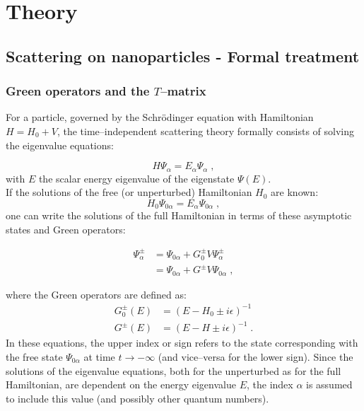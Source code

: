 \chapter{Theory} \label{appendixtheory}

\section{Scattering on nanoparticles - Formal treatment} \label{sec:formal}

\subsection{Green operators and the $T$--matrix}

For a particle, governed by the Schr\"odinger equation with Hamiltonian $H = H_0 + V$, the time--independent scattering theory formally consists of solving the eigenvalue equations:

\begin{equation*}
  H\Psi_\alpha = E_\alpha\Psi_\alpha \; ,
\end{equation*}
with $E$ the scalar energy eigenvalue of the eigenstate $\Psi(E)$.\\
If the solutions of the free (or unperturbed) Hamiltonian $H_0$ are known:
\begin{equation*}
  H_0\Psi_{0\alpha} = E_\alpha\Psi_{0\alpha} \; ,
\end{equation*}
one can write the solutions of the full Hamiltonian in terms of these asymptotic states and Green operators:

\begin{align*}
  \Psi^\pm_\alpha &= \Psi_{0\alpha} + G^\pm_0 V \Psi^\pm_\alpha  \\
  & = \Psi_{0\alpha} + G^\pm V  \Psi_{0\alpha} \; ,
\end{align*}

where the Green operators are defined as:
\begin{align*}
  G^\pm_0(E) &= (E-H_0\pm i\epsilon )^{-1}  \\
  G^\pm (E) &= (E-H\pm i\epsilon )^{-1} \; .
\end{align*}
In these equations, the upper index or sign refers to the state corresponding with the free state $\Psi_{0\alpha}$ at time $t\rightarrow - \infty$ (and vice--versa for the lower sign). Since the solutions of the eigenvalue equations, both for the unperturbed as for the full Hamiltonian, are dependent on the energy eigenvalue $E$, the index $\alpha$ is assumed to include this value (and possibly other quantum numbers).

